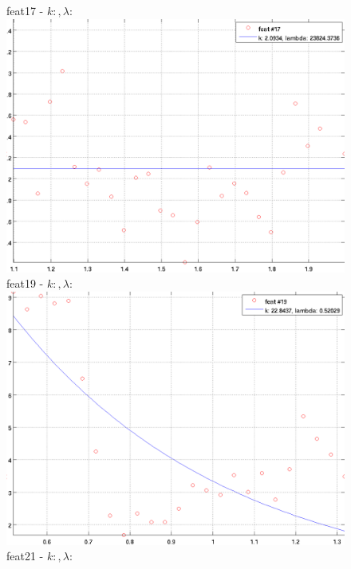 \documentclass[12pt]{report}
\begin{document}
\begin{figure}[H]
\begin{minipage}[t]{0.5\linewidth}
	\centering
	feat17 - $k: , \lambda:  $\\
	\includegraphics[scale=\imFeat]{images/feat17}\\
	feat19 - $k: , \lambda:  $\\
	\includegraphics[scale=\imFeat]{images/feat19}\\
	feat21 - $k: , \lambda:  $\\

\end{minipage}
\end{figure}
\end{document}
